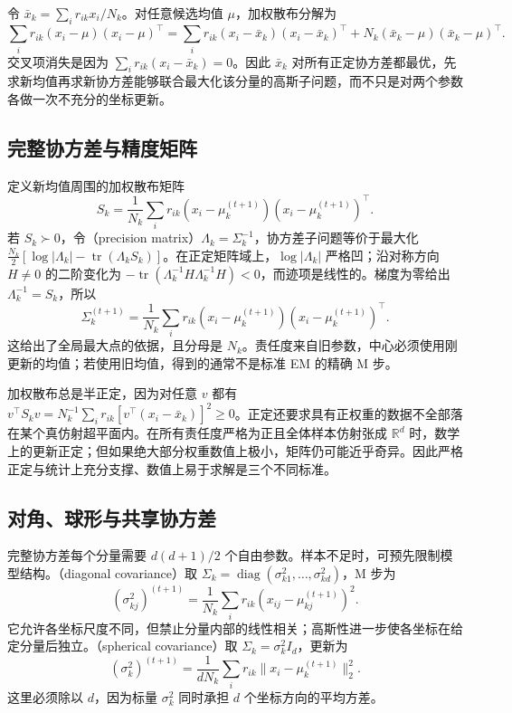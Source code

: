\documentclass[UTF8]{ctexart}
\begin{document}
令 $\bar x_k=\sum_i r_{ik}x_i/N_k$。对任意候选均值 $\mu$，加权散布分解为
\[
\sum_i r_{ik}(x_i-\mu)(x_i-\mu)^\top
=\sum_i r_{ik}(x_i-\bar x_k)(x_i-\bar x_k)^\top
+N_k(\bar x_k-\mu)(\bar x_k-\mu)^\top.
\]
交叉项消失是因为 $\sum_i r_{ik}(x_i-\bar x_k)=0$。因此 $\bar x_k$ 对所有正定协方差都最优，先求新均值再求新协方差能够联合最大化该分量的高斯子问题，而不只是对两个参数各做一次不充分的坐标更新。

\subsection{完整协方差与精度矩阵}
定义新均值周围的加权散布矩阵
\[
S_k=\frac1{N_k}\sum_i r_{ik}(x_i-\mu_k^{(t+1)})(x_i-\mu_k^{(t+1)})^\top.
\]
若 $S_k\succ0$，令（precision matrix）$\Lambda_k=\Sigma_k^{-1}$，协方差子问题等价于最大化 $\tfrac{N_k}{2}[\log|\Lambda_k|-\operatorname{tr}(\Lambda_kS_k)]$。在正定矩阵域上，$\log|\Lambda_k|$ 严格凹；沿对称方向 $H\neq0$ 的二阶变化为 $-\operatorname{tr}(\Lambda_k^{-1}H\Lambda_k^{-1}H)<0$，而迹项是线性的。梯度为零给出 $\Lambda_k^{-1}=S_k$，所以
\begin{equation}
\Sigma_k^{(t+1)}=\frac1{N_k}\sum_i r_{ik}
(x_i-\mu_k^{(t+1)})(x_i-\mu_k^{(t+1)})^\top.
\label{eq:gmm-cov-update}
\end{equation}
这给出了全局最大点的依据，且分母是 $N_k$。责任度来自旧参数，中心必须使用刚更新的均值；若使用旧均值，得到的通常不是标准 EM 的精确 M 步。

加权散布总是半正定，因为对任意 $v$ 都有 $v^\top S_kv=N_k^{-1}\sum_i r_{ik}[v^\top(x_i-\bar x_k)]^2\geq0$。正定还要求具有正权重的数据不全部落在某个真仿射超平面内。在所有责任度严格为正且全体样本仿射张成 $\mathbb R^d$ 时，数学上的更新正定；但如果绝大部分权重数值上极小，矩阵仍可能近乎奇异。因此严格正定与统计上充分支撑、数值上易于求解是三个不同标准。

\subsection{对角、球形与共享协方差}
完整协方差每个分量需要 $d(d+1)/2$ 个自由参数。样本不足时，可预先限制模型结构。（diagonal covariance）取 $\Sigma_k=\operatorname{diag}(\sigma_{k1}^2,\ldots,\sigma_{kd}^2)$，M 步为
\[
(\sigma_{kj}^2)^{(t+1)}=\frac1{N_k}\sum_i r_{ik}(x_{ij}-\mu_{kj}^{(t+1)})^2.
\]
它允许各坐标尺度不同，但禁止分量内部的线性相关；高斯性进一步使各坐标在给定分量后独立。（spherical covariance）取 $\Sigma_k=\sigma_k^2I_d$，更新为
\[
(\sigma_k^2)^{(t+1)}=\frac1{dN_k}\sum_i r_{ik}\|x_i-\mu_k^{(t+1)}\|_2^2.
\]
这里必须除以 $d$，因为标量 $\sigma_k^2$ 同时承担 $d$ 个坐标方向的平均方差。
\end{document}

